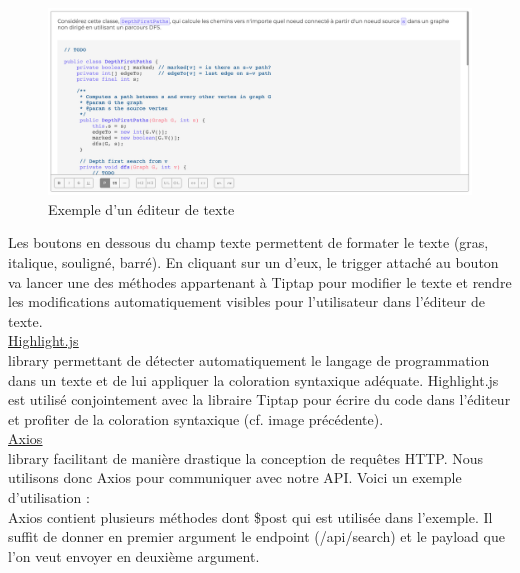 \begin{figure}[H]
    \includegraphics[width=\textwidth,height=0.35\textheight,keepaspectratio]{images/libraries/tiptap.png}
    \centering
    \caption[Tiptap : Exemple d'utilisation]{Exemple d'un éditeur de texte}
\end{figure}

Les boutons en dessous du champ texte permettent de formater le texte (gras, italique, souligné, barré). En cliquant sur un d'eux, le trigger attaché au bouton va lancer une des méthodes appartenant à Tiptap pour modifier le texte et rendre les modifications automatiquement visibles pour l'utilisateur dans l'éditeur de texte.\\

\noindent\underline{\href{https://highlightjs.org}{Highlight.js}}\\

\Gls{library} permettant de détecter automatiquement le langage de programmation dans un texte et de lui appliquer la coloration syntaxique adéquate. Highlight.js est utilisé conjointement avec la libraire Tiptap pour écrire du code dans l'éditeur et profiter de la coloration syntaxique (cf. image précédente).\\

\noindent\underline{\href{https://axios.nuxtjs.org/}{Axios}}\\

\Gls{library} facilitant de manière drastique la conception de requêtes HTTP. Nous utilisons donc Axios pour communiquer avec notre API. Voici un exemple d'utilisation : \\



Axios contient plusieurs méthodes dont \$post qui est utilisée dans l'exemple. Il suffit de donner en premier argument le endpoint (/api/search) et le payload que l'on veut envoyer en deuxième argument.\\

